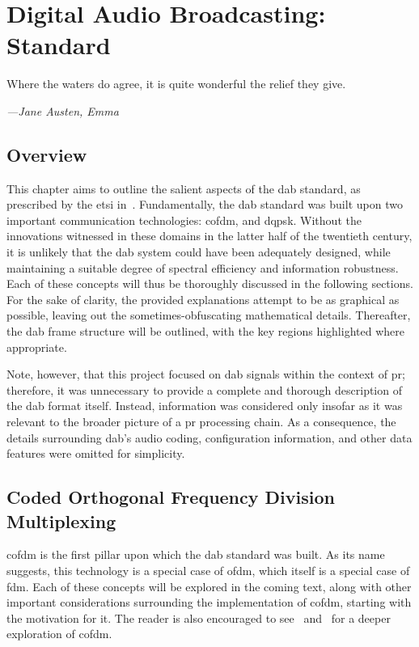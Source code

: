 \documentclass[class=report,11pt,crop=false]{standalone}
\begin{document}
\ifstandalone
\tableofcontents
\fi
\chapter{Digital Audio Broadcasting: Standard \label{ch:dab-standard}}
\epigraph{Where the waters do agree, it is quite wonderful the relief they give.}%
    {\emph{---Jane Austen, Emma}}
\vspace{0.5cm}

\section{Overview}
This chapter aims to outline the salient aspects of the \gls{dab} standard, as prescribed by the \gls{etsi} in~\cite{dabstandard}. Fundamentally, the \gls{dab} standard was built upon two important communication technologies: \gls{cofdm}, and \gls{dqpsk}. Without the innovations witnessed in these domains in the latter half of the twentieth century, it is unlikely that the \gls{dab} system could have been adequately designed, while maintaining a suitable degree of spectral efficiency and information robustness. Each of these concepts will thus be thoroughly discussed in the following sections. For the sake of clarity, the provided explanations attempt to be as graphical as possible, leaving out the sometimes-obfuscating mathematical details. Thereafter, the \gls{dab} frame structure will be outlined, with the key regions highlighted where appropriate.

Note, however, that this project focused on \gls{dab} signals within the context of \gls{pr}; therefore, it was unnecessary to provide a complete and thorough description of the \gls{dab} format itself. Instead, information was considered only insofar as it was relevant to the broader picture of a \gls{pr} processing chain. As a consequence, the details surrounding \gls{dab}'s audio coding, configuration information, and other data features were omitted for simplicity.

\section{Coded Orthogonal Frequency Division Multiplexing}
\gls{cofdm} is the first pillar upon which the \gls{dab} standard was built. As its name suggests, this technology is a special case of \gls{ofdm}, which itself is a special case of \gls{fdm}. Each of these concepts will be explored in the coming text, along with other important considerations surrounding the implementation of \gls{cofdm}, starting with the motivation for it. The reader is also encouraged to see~\cite{Raulta} and~\cite{Shelswell1995} for a deeper exploration of \gls{cofdm}.
\end{document}

